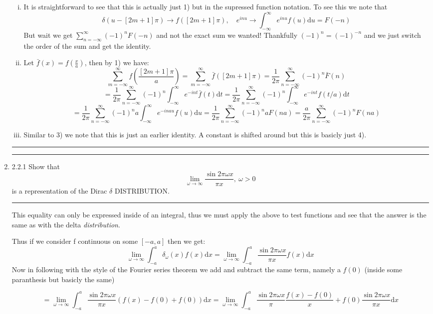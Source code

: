 \documentclass[12pt]{article}
\newcommand{\rw}{\rightarrow}
\newcommand{\di}{\mathrm{d}}
\newcommand{\intinf}{\int_{-\infty}^\infty}
\newcommand{\suminf}[1]{\sum_{#1 = -\infty}^\infty}
\theoremstyle{definition}
\begin{document}
\begin{enumerate}
\begin{enumerate}[i)]
	\item
		It is straightforward to see that this is actually just 1) but in the supressed function notation.
		To see this we note that
		\[
			\delta( u - [2m+1] \pi) \rw f([2m+1] \pi), \quad  e^{inu} \rw \intinf e^{inu} f(u) \di u = F(-n)
		\]
		But wait we get $\suminf n (-1)^n F(-n)$ and not the exact sum we wanted! Thankfully $(-1)^n = (-1)^{-n}$ and we just switch the order of the sum and get the identity.
		
	\item
		Let $\bar f(x) = f(\frac x a )$, then by 1) we have:
		\[
			\suminf m f ( \frac {[2m+1] \pi} a) = \suminf m \bar f ( [2m+1] \pi) =
			\frac 1 {2\pi} \suminf n (-1)^n \bar F (n) 
		\]
		\[
			=
			\frac 1 {2\pi} \suminf n (-1)^n \intinf e^{-int} \bar f (t) \di t
			=
			\frac 1 {2\pi} \suminf n (-1)^n \intinf e^{-int} f (t/a) \di t
		\]
		\[
			=
			\frac 1 {2\pi} \suminf n (-1)^n a  \intinf e^{-inau} f (u) \di u
			=
			\frac 1 {2\pi} \suminf n (-1)^n a F(na) 
			=
			\frac a {2\pi} \suminf n (-1)^n  F(na) 
		\]
		
	\item
		Similar to 3) we note that this is just an earlier identity. A constant is shifted around but this is basicly just 4).
		
\end{enumerate}

\hrule


\hrule
\item 2.2.1
	Show that 
	\[
		\lim_{\omega \rw \infty} \frac { \sin 2 \pi \omega x } { \pi x}, \ \omega >0
	\]
	is a representation of the Dirac $\delta$ DISTRIBUTION.
\hrule
This equality can only be expressed inside of an integral, thus we must apply the above to test functions and see that the answer is the same as with the delta \emph{distribution}.

Thus if we consider f continuous on some $[-a,a]$ then we get:
\[
	\lim_{\omega \rw \infty} \int_{-a}^a \delta_\omega (x) f(x) \di x
	=
	\lim_{\omega \rw \infty} \int_{-a}^a\frac { \sin 2 \pi \omega x } { \pi x} f(x) \di x
\]
Now in following with the style of the Fourier series theorem we add and subtract the same term, namely a $f(0)$ (inside some paranthesis but basicly the same)

\[
	=
	\lim_{\omega \rw \infty} \int_{-a}^a\frac { \sin 2 \pi \omega x } { \pi x} \left(f(x)  - f(0) + f(0) \right)\di x
	=
	\lim_{\omega \rw \infty} \int_{-a}^a\frac { \sin 2 \pi \omega x } \pi  \frac{ f(x)  - f(0)}  { x}
+f(0)\frac { \sin 2 \pi \omega x } { \pi x}\di x
\]


\end{enumerate}
\end{document}
